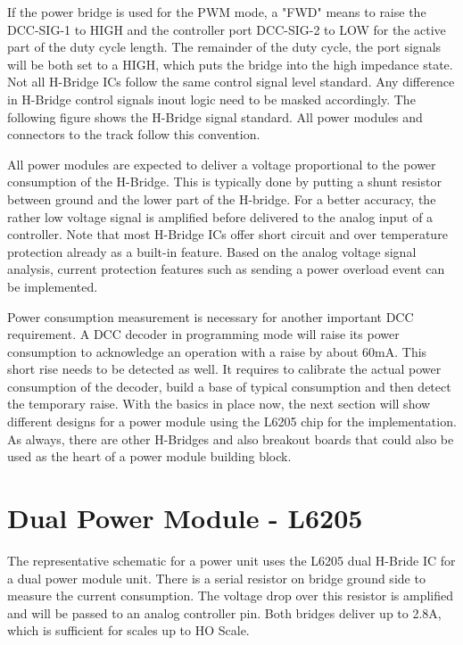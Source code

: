 If the power bridge is used for the PWM mode, a "FWD" means to raise  the DCC-SIG-1 to HIGH and the controller port DCC-SIG-2 to LOW for the active part of the duty cycle length. The remainder of the duty cycle, the port signals will be both set to a HIGH, which puts the bridge into the high impedance state. Not all H-Bridge ICs follow the same control signal level standard. Any difference in H-Bridge control signals inout logic need to be masked accordingly. The following figure shows the H-Bridge signal standard. All power modules and connectors to the track follow this convention.

All power modules are expected to deliver a voltage proportional to the power consumption of the H-Bridge. This is typically done by putting a shunt resistor between ground and the lower part of the H-bridge. For a better accuracy, the rather low voltage signal is amplified before delivered to the analog input of a controller. Note that most H-Bridge ICs offer short circuit and over temperature protection already as a built-in feature. Based on the analog voltage signal analysis, current protection features such as sending a power overload event can be implemented.

Power consumption measurement is necessary for another important DCC requirement. A DCC decoder in programming mode will raise its power consumption to acknowledge an operation with a raise by about 60mA. This short rise needs to be detected as well. It requires to calibrate the actual power consumption of the decoder, build a base of typical consumption and then detect the temporary raise. With the basics in place now, the next section will show different designs for a power module using the L6205 chip for the implementation. As always, there are other H-Bridges and also breakout boards that could also be used as the heart of a power module building block.

\section{Dual Power Module - L6205}

The representative schematic for a power unit uses the L6205 dual H-Bride IC for a dual power module unit. There is a serial resistor on bridge ground side to measure the current consumption. The voltage drop over this resistor is amplified and will be passed to an analog controller pin. Both bridges deliver up to 2.8A, which is sufficient for scales up to HO Scale.


